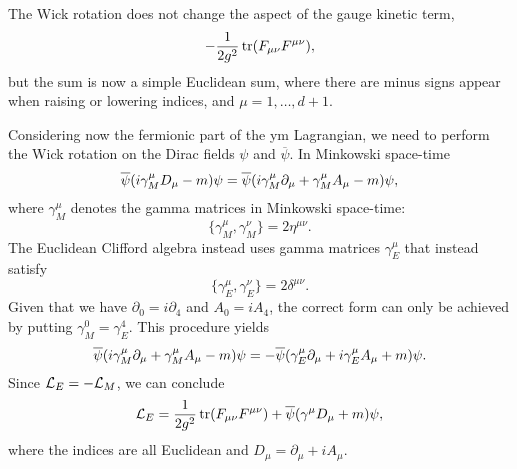 %
The Wick rotation does not change the aspect of the gauge kinetic term,
\begin{equation}
    - \frac{1}{2 g^2} \tr(F_{\mu \nu} F^{\mu \nu}),
\end{equation}
but the sum is now a simple Euclidean sum, where there are minus signs appear when raising or lowering indices, and $\mu = 1, \dots, d+1$.

Considering now the fermionic part of the \ac{ym} Lagrangian, we need to perform the Wick rotation on the Dirac fields $\psi$ and $\overline{\psi}$.
In Minkowski space-time
\begin{equation}
    \overline{\psi} \qty( i \gamma^{\mu}_M D_{\mu} - m ) \psi
    = \overline{\psi} \qty( i \gamma^{\mu}_M \partial_{\mu} + \gamma^{\mu}_M A_{\mu} - m ) \psi,
\end{equation}
where $\gamma^{\mu}_M$ denotes the gamma matrices in Minkowski space-time:
\begin{equation*}
    \{\gamma^{\mu}_M, \gamma^{\nu}_M\} = 2 \eta^{\mu \nu}.
\end{equation*}
The Euclidean Clifford algebra instead uses gamma matrices $\gamma^{\mu}_E$ that instead satisfy
\begin{equation*}
    \{\gamma^{\mu}_E, \gamma^{\nu}_E\} = 2 \delta^{\mu \nu}.
\end{equation*}
Given that we have $\partial_0 = i \partial_4$ and $A_0 = i A_4$, the correct form can only be achieved by putting $\gamma^0_M = \gamma^4_E$.
This procedure yields
\begin{equation}
    \overline{\psi} \qty( i \gamma^{\mu}_M \partial_{\mu} + \gamma^{\mu}_M A_{\mu} - m ) \psi
    =
    - \overline{\psi} \qty( \gamma^{\mu}_E \partial_{\mu} + i\gamma^{\mu}_E A_{\mu} + m ) \psi.
\end{equation}
Since $\mathcal{L}_E = - \mathcal{L}_M$, we can conclude
\begin{equation}
    \mathcal{L}_E
    = \frac{1}{2 g^2} \tr (F_{\mu \nu} F^{\mu \nu}) + \overline{\psi} \qty( \gamma^{\mu} D_{\mu} + m) \psi,
\end{equation}
where the indices are all Euclidean and $D_{\mu} = \partial_{\mu} + i A_{\mu}$.



